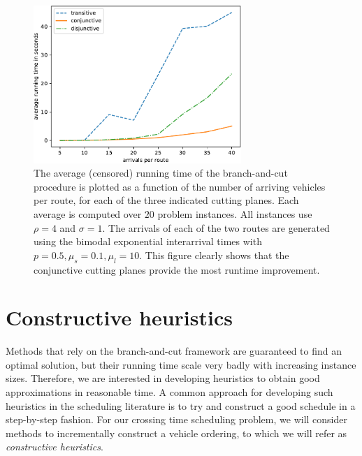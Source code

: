 \documentclass[a4paper]{article}
\theoremstyle{definition}
\theoremstyle{plain}
\begin{document}
\begin{figure}
  \centering
  \includegraphics[width=0.7\textwidth]{data-single/running_times.pdf}
  \caption{The average (censored) running time of the branch-and-cut procedure
    is plotted as a function of the number of arriving vehicles per route, for
    each of the three indicated cutting planes. Each average is computed over
    $20$ problem instances. All instances use $\rho = 4$ and $\sigma = 1$. The arrivals
    of each of the two routes are generated using the bimodal exponential
    interarrival times with $p=0.5, \mu_{s} = 0.1, \mu_{l} = 10$. This figure
    clearly shows that the conjunctive cutting planes provide the most runtime
    improvement.}
  \label{fig:running_time}
\end{figure}


\section{Constructive heuristics}

Methods that rely on the branch-and-cut framework are guaranteed to find an
optimal solution, but their running time scale very badly with increasing
instance sizes. Therefore, we are interested in developing heuristics to obtain
good approximations in reasonable time. A common approach for developing such
heuristics in the scheduling literature is to try and construct a good schedule
in a step-by-step fashion. For our crossing time scheduling problem, we will
consider methods to incrementally construct a vehicle ordering, to which we will
refer as \textit{constructive heuristics}.
\end{document}
